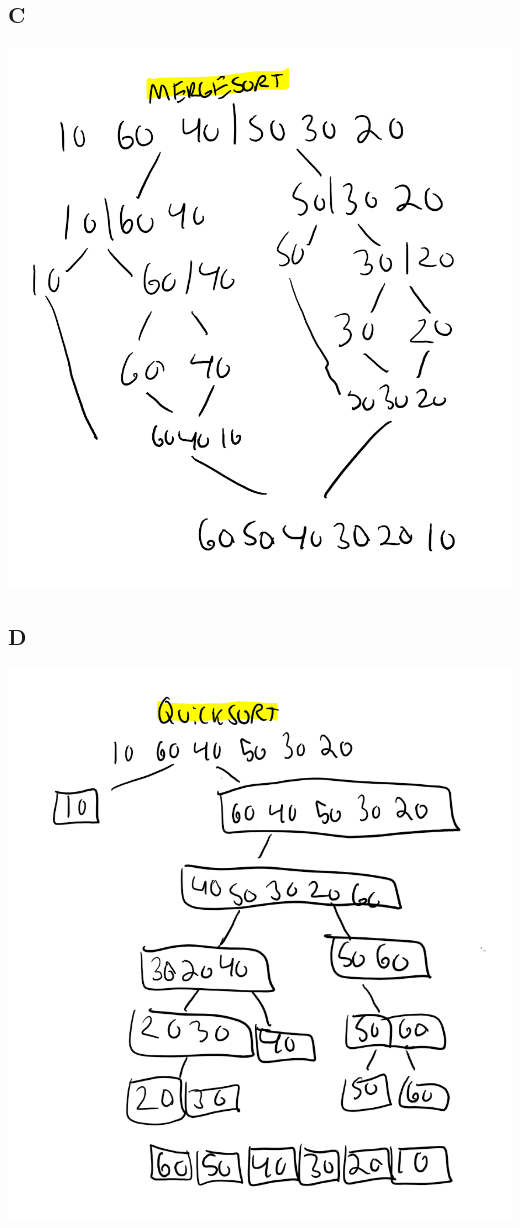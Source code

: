 \documentclass[12pt]{article} %
\begin{document}
\subsection{C}
\includegraphics[scale=0.5]{mergesort.png}
\subsection{D}
\includegraphics[scale=0.5]{quicksort.png}
\end{document}
